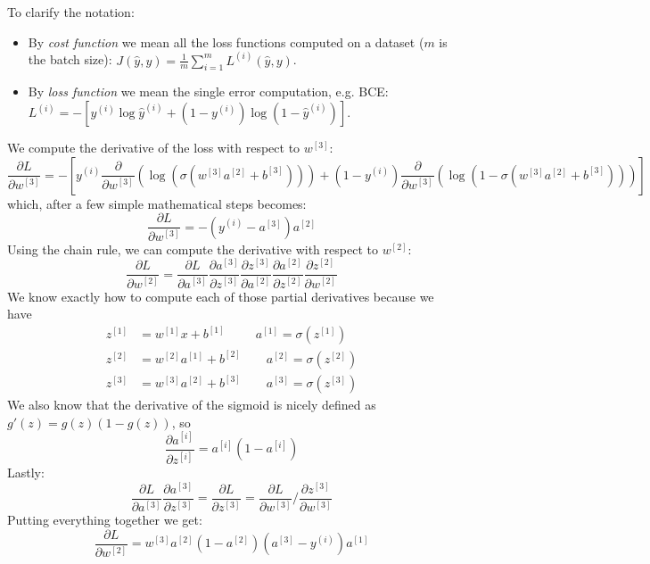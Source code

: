 To clarify the notation:
\begin{itemize}
    \item[-] By \textit{cost function} we mean all the loss functions computed on a dataset ($m$ is the batch size): $J(\hat{y}, y) = \frac{1}{m}\sum_{i=1}^{m}L^{(i)}(\hat{y}, y)$.
    \item[-] By \textit{loss function} we mean the single error computation, e.g. BCE: \\ $L^{(i)} = -[y^{(i)}\log\hat{y}^{(i)} + (1-y^{(i)})\log(1-\hat{y}^{(i)})]$.
\end{itemize}
We compute the derivative of the loss with respect to $w^{[3]}$:
\begin{equation*}
    \frac{\partial L}{\partial w^{[3]}} = -\left[ y^{(i)} \frac{\partial}{\partial w^{[3]}} (\log(\sigma(w^{[3]}a^{[2]} + b^{[3]}))) + (1 - y^{(i)}) \frac{\partial}{\partial w^{[3]}} (\log(1 - \sigma(w^{[3]}a^{[2]} + b^{[3]}))) \right]
\end{equation*}
which, after a few simple mathematical steps becomes:
\begin{equation}
\frac{\partial L}{\partial w^{[3]}} = -(y^{(i)} - a^{[3]})a^{[2]}
\end{equation}
Using the chain rule, we can compute the derivative with respect to $w^{[2]}$:
\begin{equation*}
\frac{\partial L}{\partial w^{[2]}} = \frac{\partial L}{\partial a^{[3]}} \frac{\partial a^{[3]}}{\partial z^{[3]}} \frac{\partial z^{[3]}}{\partial a^{[2]}} \frac{\partial a^{[2]}}{\partial z^{[2]}} \frac{\partial z^{[2]}}{\partial w^{[2]}}
\end{equation*}
We know exactly how to compute each of those partial derivatives because we have
\begin{equation}
\begin{aligned}
z^{[1]} &= w^{[1]}x + b^{[1]} \quad \quad \ \  a^{[1]} = \sigma(z^{[1]}) \\
z^{[2]} &= w^{[2]}a^{[1]} + b^{[2]} \quad\quad a^{[2]} = \sigma(z^{[2]}) \\
z^{[3]} &= w^{[3]}a^{[2]} + b^{[3]} \quad\quad a^{[3]} = \sigma(z^{[3]})
\end{aligned}
\end{equation}
We also know that the derivative of the sigmoid is nicely defined as $g'(z) = g(z)(1-g(z))$, so 
\begin{equation*}
    \dfrac{\partial a^{[i]}}{\partial z^{[i]}} = a^{[i]}(1-a^{[i]})  
\end{equation*}
Lastly: 
\begin{equation*}
    \frac{\partial L}{\partial a^{[3]}} \frac{\partial a^{[3]}}{\partial z^{[3]}} = \dfrac{\partial L}{\partial z^{[3]}}=\dfrac{\partial L}{\partial w^{[3]}} / \dfrac{\partial z^{[3]}}{\partial w^{[3]}}
\end{equation*}
Putting everything together we get:
\begin{equation}
    \frac{\partial L}{\partial w^{[2]}} = w^{[3]} a^{[2]} (1 - a^{[2]}) (a^{[3]} - y^{(i)}) a^{[1]}
\end{equation}

